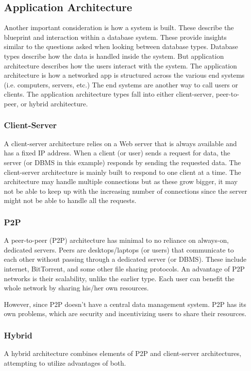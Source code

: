 \documentclass[acmsmall]{acmart}
\begin{document}
\subsection{Application Architecture}
Another important consideration is how a system is built. These describe the blueprint and interaction within a database system. These provide insights similar to the questions asked when looking between database types. Database types describe how the data is handled inside the system. But application architecture describes how the users interact with the system. The application architecture is how a networked app is structured across the various end systems (i.e. computers, servers, etc.) \cite{kurose} The end systems are another way to call users or clients. 
The application architecture types fall into either client-server, peer-to-peer, or hybrid architecture.

\subsubsection{Client-Server} \label{client-server}
A client-server architecture relies on a Web server that is always available and has a fixed IP address. When a client (or user) sends a request for data, the server (or DBMS in this example) responds by sending the requested data. The client-server architecture is mainly built to respond to one client at a time. The architecture may handle multiple connections but as these grow bigger, it may not be able to keep up with the increasing number of connections since the server might not be able to handle all the requests.

\subsubsection{P2P} \label{p2p}
A peer-to-peer (P2P) architecture has minimal to no reliance on always-on, dedicated servers. Peers are desktops/laptops (or users) that communicate to each other without passing through a dedicated server (or DBMS). These include internet, BitTorrent, and some other file sharing protocols. An advantage of P2P networks is their scalability, unlike the earlier type. Each user can benefit the whole network by sharing his/her own resources. 

However, since P2P doesn't have a central data management system. P2P has its own problems, which are security and incentivizing users to share their resources.

\subsubsection{Hybrid}
A hybrid architecture combines elements of P2P and client-server architectures, attempting to utilize advantages of both.
\end{document}
